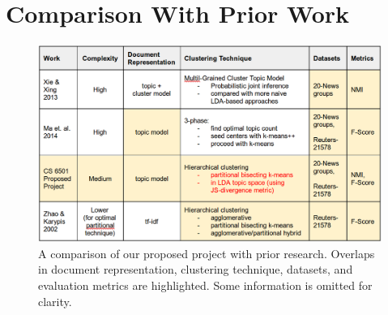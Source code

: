 \documentclass{sig-alternate-05-2015}
\begin{document}




\balancecolumns

\appendix
\section{Comparison With Prior Work}\label{comparison}

\begin{figure}[h]
\centering
\includegraphics[width=6in]{comparisontable}
\caption{A comparison of our proposed project with prior research. Overlaps in document representation, clustering technique, datasets, and evaluation metrics are highlighted. Some information is omitted for clarity.}
\vskip -6pt
\end{figure}
\end{document}
